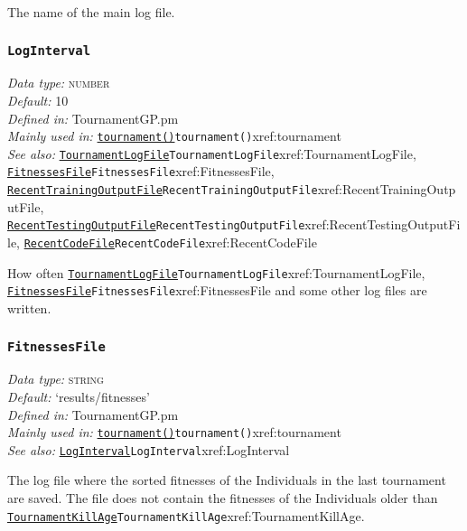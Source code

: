 \documentclass[a4paper]{article}
\begin{document}
The name of the main log file.

\subsubsection{\texttt{LogInterval}}\label{xref:LogInterval}
\begin{flushleft}
\textit{Data type:} \textsc{number}\\
\textit{Default:} 10\\
\textit{Defined in:} TournamentGP.pm\\
\textit{Mainly used in:} \hyperref[no]{\texttt{tournament()}}{\texttt{tournament()}}{xref:tournament}\\
\textit{See also:} \hyperref[no]{\texttt{TournamentLogFile}}{\texttt{TournamentLogFile}}{xref:TournamentLogFile}, \hyperref[no]{\texttt{FitnessesFile}}{\texttt{FitnessesFile}}{xref:FitnessesFile}, \hyperref[no]{\texttt{RecentTrainingOutputFile}}{\texttt{RecentTrainingOutputFile}}{xref:RecentTrainingOutputFile}, \hyperref[no]{\texttt{RecentTestingOutputFile}}{\texttt{RecentTestingOutputFile}}{xref:RecentTestingOutputFile}, \hyperref[no]{\texttt{RecentCodeFile}}{\texttt{RecentCodeFile}}{xref:RecentCodeFile}
\end{flushleft}

How often \hyperref[no]{\texttt{TournamentLogFile}}{\texttt{TournamentLogFile}}{xref:TournamentLogFile}, \hyperref[no]{\texttt{FitnessesFile}}{\texttt{FitnessesFile}}{xref:FitnessesFile} and some
other log files are written.

\subsubsection{\texttt{FitnessesFile}}\label{xref:FitnessesFile}
\begin{flushleft}
\textit{Data type:} \textsc{string}\\
\textit{Default:} `results/fitnesses'\\
\textit{Defined in:} TournamentGP.pm\\
\textit{Mainly used in:} \hyperref[no]{\texttt{tournament()}}{\texttt{tournament()}}{xref:tournament}\\
\textit{See also:} \hyperref[no]{\texttt{LogInterval}}{\texttt{LogInterval}}{xref:LogInterval}
\end{flushleft}

The log file where the sorted fitnesses of the Individuals in the last
tournament are saved.  The file does not contain the fitnesses of the
Individuals older than \hyperref[no]{\texttt{TournamentKillAge}}{\texttt{TournamentKillAge}}{xref:TournamentKillAge}.
\end{document}
